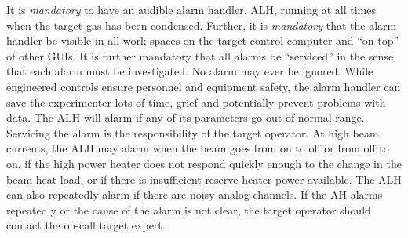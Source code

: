\begin{safetyen}{0}{0} 
It is \emph{mandatory} to have an audible alarm handler, ALH, running
at all times when the target gas has been condensed.  Further, it is
\emph{mandatory} that the alarm handler be visible in all work spaces
on the target control computer and ``on top'' of other GUIs. It is
further mandatory that all alarms be ``serviced'' in the sense that
each alarm must be investigated. No alarm may ever be ignored.
While engineered controls ensure personnel and equipment safety, the
alarm handler can save the experimenter lots of time, grief and
potentially prevent problems with data. The ALH will alarm if any of
its parameters go out of normal range. Servicing the alarm is the
responsibility of the target operator. At high beam currents, the ALH
may alarm when the beam goes from on to off or from off to on, if the
high power heater does not respond quickly enough to the change in the
beam heat load, or if there is insufficient reserve heater power
available. The ALH can also repeatedly alarm if there are noisy analog
channels.
If the AH alarms repeatedly or the
cause of the alarm is not clear, the target operator should contact
the on-call target expert.
\end{safetyen}
